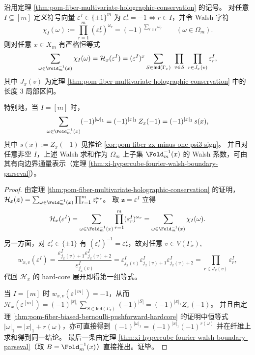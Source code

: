 \begin{corollary}\label{cor:pom-fiber-walsh-hardcore-stokes-sign}
沿用定理 \ref{thm:pom-fiber-multivariate-holographic-conservation} 的记号。
对任意 \(I\subseteq[m]\) 定义符号向量 \(\varepsilon^I\in\{\pm1\}^m\) 为
\(
\varepsilon^I_r=-1\iff r\in I
\)，并令 Walsh 字符
\[
\chi_I(\omega):=\prod_{r=1}^{m}(\varepsilon^I_r)^{\omega_r}=(-1)^{\sum_{r\in I}\omega_r}\qquad(\omega\in\Omega_m).
\]
则对任意 \(x\in X_m\) 有严格恒等式
\[
\sum_{\omega\in \Fold_m^{-1}(x)}\chi_I(\omega)=\mathcal H_x(\varepsilon^I)
=(\varepsilon^I)^x\sum_{S\in\mathsf{Ind}(\Gamma_x)}\ \prod_{v\in S}\ \prod_{r\in J_x(v)}\varepsilon^I_r,
\]
其中 \(J_x(v)\) 为定理 \ref{thm:pom-fiber-multivariate-holographic-conservation} 中的长度 \(3\) 局部区间。
\par
特别地，当 \(I=[m]\) 时，
\[
\sum_{\omega\in \Fold_m^{-1}(x)}(-1)^{|\omega|_1}=(-1)^{|x|_1}\,Z_x(-1)=(-1)^{|x|_1}\,s(x),
\]
其中 \(s(x):=Z_x(-1)\) 见推论 \ref{cor:pom-fiber-zx-minus-one-psi3-sign}。
并且对任意非空 \(I\)，上述 Walsh 求和作为 \(\Omega_m\) 上子集 \(\Fold_m^{-1}(x)\) 的 Walsh 系数，可由其有向边界通量表示（定理 \ref{thm:xi-hypercube-fourier-walsh-boundary-parseval}）。
\end{corollary}
\begin{proof}
由定理 \ref{thm:pom-fiber-multivariate-holographic-conservation} 的证明，
\(
\mathcal H_x(\boldsymbol z)=\sum_{\omega\in\Fold_m^{-1}(x)}\prod_{r=1}^m z_r^{\omega_r}
\)。
取 \(\boldsymbol z=\varepsilon^I\) 立得
\[
\mathcal H_x(\varepsilon^I)=\sum_{\omega\in\Fold_m^{-1}(x)}\prod_{r=1}^{m}(\varepsilon^I_r)^{\omega_r}
=\sum_{\omega\in\Fold_m^{-1}(x)}\chi_I(\omega).
\]
另一方面，对 \(\varepsilon^I_r\in\{\pm 1\}\) 有 \((\varepsilon^I_r)^{-1}=\varepsilon^I_r\)，故对任意 \(v\in V(\Gamma_x)\),
\[
w_{x,v}(\varepsilon^I)
=\frac{\varepsilon^I_{j_x(v)+1}\varepsilon^I_{j_x(v)+2}}{\varepsilon^I_{j_x(v)}}
=\varepsilon^I_{j_x(v)}\varepsilon^I_{j_x(v)+1}\varepsilon^I_{j_x(v)+2}
=\prod_{r\in J_x(v)}\varepsilon^I_r,
\]
代回 \(\mathcal H_x\) 的 hard-core 展开即得第一组等式。
\par
当 \(I=[m]\) 时 \(w_{x,v}(\varepsilon^{[m]})=-1\)，从而
\(
\mathcal H_x(\varepsilon^{[m]})=(-1)^{|x|_1}\sum_{S\in\mathsf{Ind}(\Gamma_x)}(-1)^{|S|}
=(-1)^{|x|_1}Z_x(-1)
\)。
并且由定理 \ref{thm:pom-fiber-biased-bernoulli-pushforward-hardcore} 的证明中恒等式 \(|\omega|_1=|x|_1+r(\omega)\)，亦可直接得到
\(
(-1)^{|\omega|_1}=(-1)^{|x|_1}(-1)^{r(\omega)}
\)
并在纤维上求和得到同一结论。
最后一条由定理 \ref{thm:xi-hypercube-fourier-walsh-boundary-parseval}（取 \(B=\Fold_m^{-1}(x)\)）直接推出。证毕。
\end{proof}

\endinput

